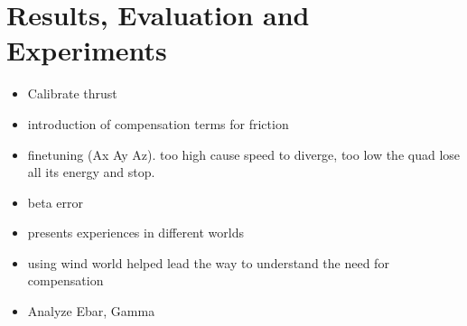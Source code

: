 \section{Results, Evaluation and Experiments}
 \begin{itemize}
    \item Calibrate thrust
    \item  introduction of compensation terms for friction
    \item finetuning (Ax Ay Az). too high cause speed to diverge, too low the quad lose all its energy and stop. 
    \item beta error
    \item presents experiences in different worlds
    \item using wind world helped lead the way to understand the need for compensation
    \item Analyze Ebar, Gamma
 \end{itemize}
